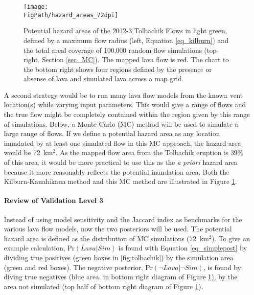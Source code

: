 		\begin{figure}
			\centering
			\texttt{[image: \\FigPath/hazard\_areas\_72dpi]}
			\caption[Potential hazard areas of the 2012-3 Tolbachik Flows]{Potential hazard areas of the 2012-3 Tolbachik Flows in light green, defined by a maximum flow radius (left, Equation \ref{eq_kilburn}) and the total areal coverage of 100,000 random flow simulations (top-right, Section \ref{sec_MC}). The mapped lava flow is red. The chart to the bottom right shows four regions defined by the presence or absense of lava and simulated lava across a map grid.}
			\label{fig_hazardarea}
		\end{figure}
	
	A second strategy would be to run many lava flow models from the known vent location(s) while varying input parameters. This would give a range of flows and the true flow might be completely contained within the region given by this range of simulations. Below, a Monte Carlo (MC) method will be used to simulate a large range of flows. If we define a potential hazard area as any location inundated by at least one simulated flow in this MC approach, the hazard area would be 72~km$^2$. As the mapped flow area from the Tolbachik eruption is 39\% of this area, it would be more practical to use this as the \textit{a priori} hazard area because it more reasonably reflects the potential inundation area. Both the Kilburn-Kauahikaua method and this MC method are illustrated in Figure \ref{fig_hazardarea}.				
	
	\paragraph{Review of Validation Level 3} Instead of using model sensitivity and the Jaccard index as benchmarks for the various lava flow models, now the two posteriors will be used. The potential hazard area is defined as the distribution of MC simulations (72~km$^2$). To give an example calculation, $\text{Pr}(Lava|Sim)$ is found with Equation \ref{eq_simplepost} by dividing true positives (green boxes in \ref{fig:tolbachik}) by the simulation area (green and red boxes). The negative posterior, $\text{Pr}(\neg Lava|\neg Sim)$, is found by diving true negatives (blue area, in bottom right diagram of Figure \ref{fig_hazardarea}), by the area not simulated (top half of bottom right diagram of Figure \ref{fig_hazardarea}).
	
